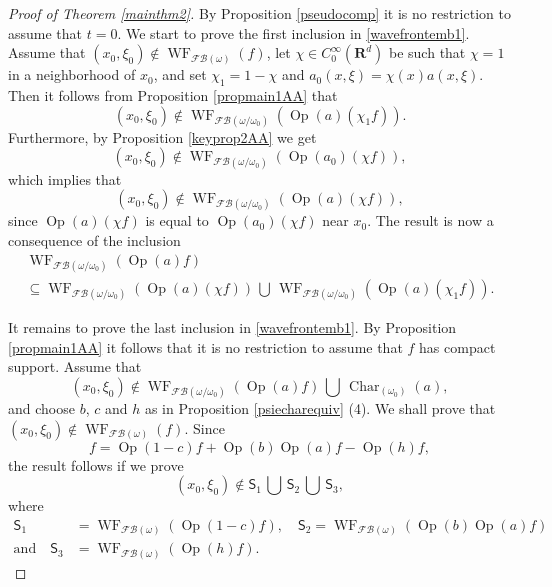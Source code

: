 \documentclass[12pt,a4paper,reqno]{amsart}
\numberwithin{equation}{section}
\numberwithin{thm}{section}
\theoremstyle{definition}
\theoremstyle{remark}
\begin{document}
\begin{proof}[Proof of Theorem \ref{mainthm2}]
By Proposition \ref{pseudocomp} it is no restriction to assume that
$t=0$.
We start to prove the first inclusion in \eqref{wavefrontemb1}.
Assume that $(x_0,\xi _0)\notin {\operatorname{WF}} _{{\mathscr F\! \mathscr B} {(\omega)}}(f)$, let $\chi \in C_0^\infty ({\mathbf R^{d}})$ be such that $\chi =1$
in a neighborhood of $x_0$, and set $\chi _1=1-\chi$ and $a_0(x,\xi
)=\chi (x)a(x,\xi )$. Then it follows from Proposition
\ref{propmain1AA} that
$$
(x_0,\xi _0)\notin {\operatorname{WF}} _{{\mathscr F\! \mathscr B} {(\omega /\omega _0)}}({\operatorname{Op}} (a)(\chi
_1f)).
$$
Furthermore, by Proposition \ref{keyprop2AA} we get
\begin{equation*}
(x_0,\xi _0)\notin {\operatorname{WF}} _{{\mathscr F\! \mathscr B} {(\omega /\omega _0
)}}({\operatorname{Op}} (a_0)(\chi f)),
\end{equation*}
which implies that
$$
(x_0,\xi _0)\notin {\operatorname{WF}} _{{\mathscr F\! \mathscr B} {(\omega /\omega _0 )}}({\operatorname{Op}} (a)(\chi f)),
$$
since ${\operatorname{Op}} (a)(\chi f)$ is equal to ${\operatorname{Op}} (a_0)(\chi f)$ near
$x_0$. The result is now a consequence of the inclusion
\begin{multline*}
{\operatorname{WF}} _{{\mathscr F\! \mathscr B} {(\omega /\omega _0)}}({\operatorname{Op}} (a)f)
\\[1ex]
\subseteq {\operatorname{WF}} _{{\mathscr F\! \mathscr B} {(\omega /\omega _0 )}}({\operatorname{Op}} (a)(\chi f)){{\textstyle{\, \bigcup \, }}} {\operatorname{WF}} _{{\mathscr F\! \mathscr B}
{(\omega /\omega _0 )}}({\operatorname{Op}} (a)(\chi _1f)).
\end{multline*}

\par

It remains to prove the last inclusion in \eqref{wavefrontemb1}. By
Proposition \ref{propmain1AA} it follows that it is no restriction to
assume that $f$ has compact support. Assume that
$$
(x_0,\xi _0)\notin  {\operatorname{WF}} _{{\mathscr F\! \mathscr B} (\omega /\omega _0)}({\operatorname{Op}}
(a)f){{\textstyle{\, \bigcup \, }}} {\operatorname{Char}} _{(\omega _0)}(a),
$$
and choose $b$, $c$ and $h$ as in Proposition \ref{psiecharequiv} (4). We
shall prove that $(x_0,\xi _0)\notin  {\operatorname{WF}}  _{{\mathscr F\! \mathscr B} (\omega )}(f)$. Since
$$
f = {\operatorname{Op}} (1-c)f + {\operatorname{Op}} (b){\operatorname{Op}} (a)f-{\operatorname{Op}} (h)f,
$$
the result follows if we prove
$$
(x_0,\xi _0)\notin \mathsf S_1{{\textstyle{\, \bigcup \, }}} \mathsf S_2{{\textstyle{\, \bigcup \, }}} \mathsf
S_3,
$$
where
\begin{align*}
\mathsf S_1 &= {\operatorname{WF}} _{{\mathscr F\! \mathscr B} (\omega )}({\operatorname{Op}} (1-c)f),\quad
\mathsf S_2 = {\operatorname{WF}} _{{\mathscr F\! \mathscr B} (\omega )}({\operatorname{Op}} (b){\operatorname{Op}} (a)f)
\\[1ex]
\text{and}\quad \mathsf S_3 &= {\operatorname{WF}} _{{\mathscr F\! \mathscr B} (\omega )}({\operatorname{Op}}
(h)f).
\end{align*}


\end{proof}
\end{document}
